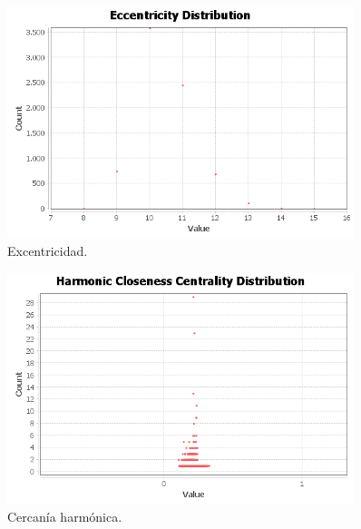 \begin{figure}[ht]
    \centerfloat
    \includegraphics[width=0.9\textwidth]{img/resultados/distanciaGrafo/Eccentricity Distribution.png}
    \caption{Excentricidad.}
\end{figure}

\begin{figure}[ht]
    \centerfloat
    \includegraphics[width=0.9\textwidth]{img/resultados/distanciaGrafo/Harmonic Closeness Centrality Distribution.png}
    \caption{Cercanía harmónica.}
\end{figure}

